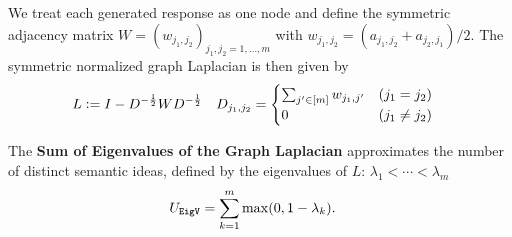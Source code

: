 \begin{block}{\color{mydarkgreen}{Estimating $U$ and $C$ from Similarities}}


We treat each generated response as one node and define the symmetric adjacency matrix $W = (w_{j_1,j_2})_{j_1,j_2=1,\ldots,m}$ with
$w_{j_1,j_2} = (a_{j_1,j_2}+a_{j_2,j_1})/2$.
The symmetric normalized graph Laplacian is then given by
\begin{align}
    L &\vcentcolon= I - D^{-\frac{1}{2}}WD^{-\frac{1}{2}} & 
    D_{j_1,j_2} & =\begin{cases}\sum_{j'\in[m]} w_{j_1,j'} & (j_1=j_2)\\ 0 & (j_1\neq j_2)\end{cases} \label{eq:D}
\end{align}



\tcolorbox[colback=white, colframe=black, boxrule=1pt]
The \textbf{Sum of Eigenvalues of the Graph Laplacian} approximates the number of distinct semantic ideas, defined by the eigenvalues of $L$: $\lambda_1<\cdots<\lambda_m$
\begin{align}
    U_{\texttt{EigV}} &= \sum_{k=1}^m \max(0,1-\lambda_k) \label{eq:eigv}.
\end{align}




\end{block}
